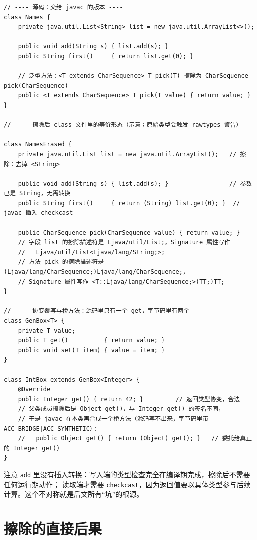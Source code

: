\documentclass[12pt,a4paper,fontset=fandol]{ctexbook}
\newcommand{\javalabel}{%
  \tcbox[on line,colback=javaheadbg,colframe=javaheadbg,
    boxrule=0pt,arc=1pt,left=2pt,right=2pt,top=1pt,bottom=1pt,
    colupper=white,fontupper=\scriptsize\bfseries]{Java}}
\newcommand{\kw}[1]{\texttt{#1}}
\begin{document}
\javalabel
\begin{lstlisting}[style=javastyle,caption={泛型源码与擦除后的等价形态：原始类型、checkcast 与合成桥方法}]
// ---- 源码：交给 javac 的版本 ----
class Names {
    private java.util.List<String> list = new java.util.ArrayList<>();

    public void add(String s) { list.add(s); }
    public String first()     { return list.get(0); }

    // 泛型方法：<T extends CharSequence> T pick(T) 擦除为 CharSequence pick(CharSequence)
    public <T extends CharSequence> T pick(T value) { return value; }
}

// ---- 擦除后 class 文件里的等价形态（示意；原始类型会触发 rawtypes 警告） ----
class NamesErased {
    private java.util.List list = new java.util.ArrayList();   // 擦除：去掉 <String>

    public void add(String s) { list.add(s); }                 // 参数已是 String，无需转换
    public String first()     { return (String) list.get(0); }  // javac 插入 checkcast

    public CharSequence pick(CharSequence value) { return value; }
    // 字段 list 的擦除描述符是 Ljava/util/List;，Signature 属性写作
    //   Ljava/util/List<Ljava/lang/String;>;
    // 方法 pick 的擦除描述符是 (Ljava/lang/CharSequence;)Ljava/lang/CharSequence;，
    // Signature 属性写作 <T::Ljava/lang/CharSequence;>(TT;)TT;
}

// ---- 协变覆写与桥方法：源码里只有一个 get，字节码里有两个 ----
class GenBox<T> {
    private T value;
    public T get()          { return value; }
    public void set(T item) { value = item; }
}

class IntBox extends GenBox<Integer> {
    @Override
    public Integer get() { return 42; }         // 返回类型协变，合法
    // 父类成员擦除后是 Object get()，与 Integer get() 的签名不同，
    // 于是 javac 在本类再合成一个桥方法（源码写不出来，字节码里带 ACC_BRIDGE|ACC_SYNTHETIC）：
    //   public Object get() { return (Object) get(); }   // 委托给真正的 Integer get()
}
\end{lstlisting}

注意 \kw{add} 里没有插入转换：写入端的类型检查完全在编译期完成，擦除后不需要任何运行期动作；
读取端才需要 \kw{checkcast}，因为返回值要以具体类型参与后续计算。这个不对称就是后文所有“坑”的根源。

\section{擦除的直接后果}
\end{document}
